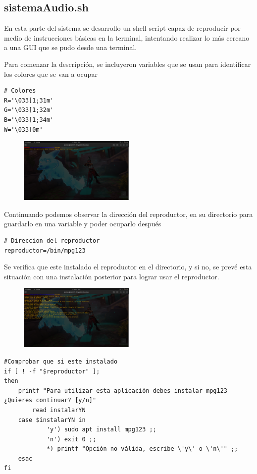 \documentclass[letterpaper,12pt]{article} %
\begin{document}
\subsection{sistemaAudio.sh}

En esta parte del sistema se desarrollo un shell script capaz de reproducir por medio de instrucciones básicas en la terminal, intentando realizar lo más cercano a una GUI que se pudo desde una terminal.

Para comenzar la descripción, se incluyeron variables que se usan para identificar los colores que se van a ocupar

\begin{verbatim}
# Colores
R='\033[1;31m'
G='\033[1;32m'
B='\033[1;34m'
W='\033[0m'
\end{verbatim}
\begin{figure}[H]
    \centering
    \includegraphics[width=0.5\textwidth]{figurasShell/Audio1.png}
\end{figure}
Continuando podemos observar la dirección del reproductor, en su directorio para guardarlo en una variable y poder ocuparlo después

\begin{verbatim}
# Direccion del reproductor
reproductor=/bin/mpg123
\end{verbatim}

Se verifica que este instalado el reproductor en el directorio, y si no, se prevé esta situación con una instalación posterior para lograr usar el reproductor.
\begin{figure}[H]
    \centering
    \includegraphics[width=0.5\textwidth]{figurasShell/Audio2.png}
\end{figure}
\begin{verbatim}
#Comprobar que si este instalado
if [ ! -f "$reproductor" ];
then
	printf "Para utilizar esta aplicación debes instalar mpg123 ¿Quieres continuar? [y/n]"
       	read instalarYN
   	case $instalarYN in
       		'y') sudo apt install mpg123 ;;
       		'n') exit 0 ;;
       		*) printf "Opción no válida, escribe \'y\' o \'n\'" ;;
	esac
fi

\end{verbatim}
\end{document}
